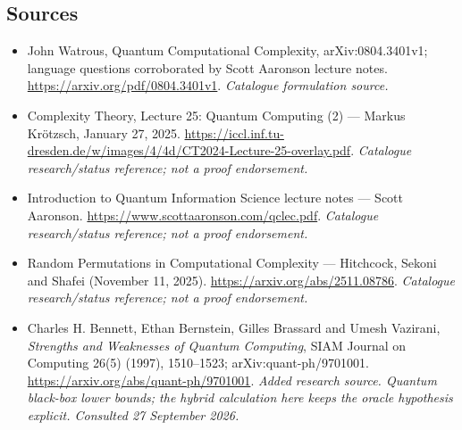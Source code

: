 \documentclass[11pt,a4paper]{article}
\begin{document}
\subsection{Sources}
\begin{itemize}\raggedright
\item[\textnormal{[S1]}]\hypertarget{source:statement:1}{} John Watrous, Quantum Computational Complexity, arXiv:0804.3401v1; language questions corroborated by Scott Aaronson lecture notes.
\url{https://arxiv.org/pdf/0804.3401v1}.
{\small\textit{Catalogue formulation source.}}
\item[\textnormal{[S2]}]\hypertarget{source:statement:2}{} Complexity Theory, Lecture 25: Quantum Computing (2) — Markus Krötzsch, January 27, 2025.
\url{https://iccl.inf.tu-dresden.de/w/images/4/4d/CT2024-Lecture-25-overlay.pdf}.
{\small\textit{Catalogue research/status reference; not a proof endorsement.}}
\item[\textnormal{[S3]}]\hypertarget{source:statement:3}{} Introduction to Quantum Information Science lecture notes — Scott Aaronson.
\url{https://www.scottaaronson.com/qclec.pdf}.
{\small\textit{Catalogue research/status reference; not a proof endorsement.}}
\item[\textnormal{[S4]}]\hypertarget{source:statement:4}{} Random Permutations in Computational Complexity — Hitchcock, Sekoni and Shafei (November 11, 2025).
\url{https://arxiv.org/abs/2511.08786}.
{\small\textit{Catalogue research/status reference; not a proof endorsement.}}
\item[\textnormal{[E1]}]\hypertarget{extra:statement:1}{} Charles H. Bennett, Ethan Bernstein, Gilles Brassard and Umesh Vazirani, \emph{Strengths and Weaknesses of Quantum Computing}, SIAM Journal on Computing 26(5) (1997), 1510--1523; arXiv:quant-ph/9701001.
\url{https://arxiv.org/abs/quant-ph/9701001}.
{\small\textit{Added research source. Quantum black-box lower bounds; the hybrid calculation here keeps the oracle hypothesis explicit. Consulted 27 September 2026.}}
\end{itemize}

\end{document}
